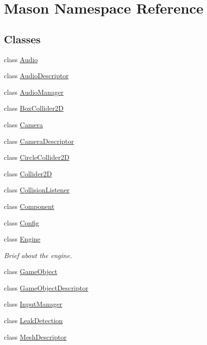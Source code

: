 \hypertarget{namespace_mason}{}\section{Mason Namespace Reference}
\label{namespace_mason}
\subsection*{Classes}
\begin{DoxyCompactItemize}
\item 
class \hyperlink{class_mason_1_1_audio}{Audio}
\item 
class \hyperlink{class_mason_1_1_audio_descriptor}{Audio\+Descriptor}
\item 
class \hyperlink{class_mason_1_1_audio_manager}{Audio\+Manager}
\item 
class \hyperlink{class_mason_1_1_box_collider2_d}{Box\+Collider2D}
\item 
class \hyperlink{class_mason_1_1_camera}{Camera}
\item 
class \hyperlink{class_mason_1_1_camera_descriptor}{Camera\+Descriptor}
\item 
class \hyperlink{class_mason_1_1_circle_collider2_d}{Circle\+Collider2D}
\item 
class \hyperlink{class_mason_1_1_collider2_d}{Collider2D}
\item 
class \hyperlink{class_mason_1_1_collision_listener}{Collision\+Listener}
\item 
class \hyperlink{class_mason_1_1_component}{Component}
\item 
class \hyperlink{class_mason_1_1_config}{Config}
\item 
class \hyperlink{class_mason_1_1_engine}{Engine}
\begin{DoxyCompactList}\small\item\em Brief about the engine. \end{DoxyCompactList}\item 
class \hyperlink{class_mason_1_1_game_object}{Game\+Object}
\item 
class \hyperlink{class_mason_1_1_game_object_descriptor}{Game\+Object\+Descriptor}
\item 
class \hyperlink{class_mason_1_1_input_manager}{Input\+Manager}
\item 
class \hyperlink{class_mason_1_1_leak_detection}{Leak\+Detection}
\item 
class \hyperlink{class_mason_1_1_mesh_descriptor}{Mesh\+Descriptor}
\item 

\end{DoxyCompactItemize}
